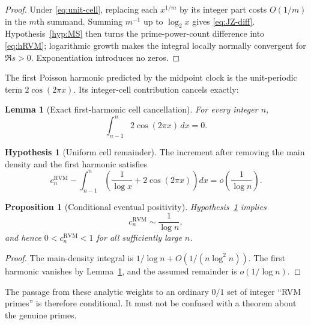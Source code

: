 \documentclass[11pt,reqno]{amsart}
\newtheorem{proposition}[theorem]{Proposition}
\newtheorem{lemma}[theorem]{Lemma}
\theoremstyle{definition}
\newtheorem{hypothesis}[theorem]{Hypothesis}
\theoremstyle{remark}
\newcommand{\RVM}{\mathrm{RVM}}
\begin{document}
\begin{proof}
Under \eqref{eq:unit-cell}, replacing each $x^{1/m}$ by its integer part costs $O(1/m)$ in the $m$th summand.  Summing $m^{-1}$ up to $\log_2x$ gives \eqref{eq:JZ-diff}.  Hypothesis~\ref{hyp:MS} then turns the prime-power-count difference into \eqref{eq:hRVM}; logarithmic growth makes the integral locally normally convergent for $\Re s>0$.  Exponentiation introduces no zeros.
\end{proof}

The first Poisson harmonic predicted by the midpoint clock is the unit-periodic term $2\cos(2\pi x)$.  Its integer-cell contribution cancels exactly:
\begin{lemma}[Exact first-harmonic cell cancellation]\label{lem:cell-cancel}
For every integer $n$,
\begin{equation}\label{eq:cell-cancel}
 \boxed{\int_{n-1}^{n}2\cos(2\pi x)\,dx=0.}
\end{equation}
\end{lemma}

\begin{hypothesis}[Uniform cell remainder]\label{hyp:cell-remainder}
The increment after removing the main density and the first harmonic satisfies
\begin{equation}\label{eq:cell-remainder}
 c_n^{\RVM}
 -\int_{n-1}^{n}\left(\frac1{\log x}+2\cos(2\pi x)\right)dx
 =o\!\left(\frac1{\log n}\right).
\end{equation}
\end{hypothesis}

\begin{proposition}[Conditional eventual positivity]\label{prop:eventual-positive}
Hypothesis~\ref{hyp:cell-remainder} implies
\begin{equation}
 c_n^{\RVM}\sim\frac1{\log n},
\end{equation}
and hence $0<c_n^{\RVM}<1$ for all sufficiently large $n$.
\end{proposition}

\begin{proof}
The main-density integral is
$1/\log n+O(1/(n\log^2n))$.  The first harmonic vanishes by Lemma~\ref{lem:cell-cancel}, and the assumed remainder is $o(1/\log n)$.
\end{proof}

The passage from these analytic weights to an ordinary $0/1$ set of integer ``RVM primes'' is therefore conditional.  It must not be confused with a theorem about the genuine primes.
\end{document}
